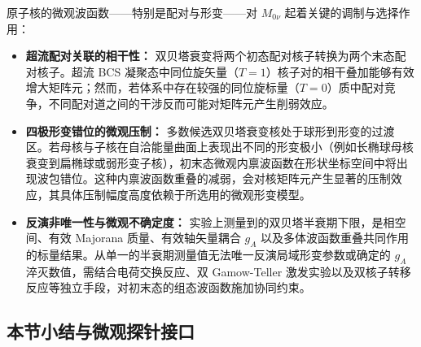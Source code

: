 原子核的微观波函数——特别是配对与形变——对 $M_{0\nu}$ 起着关键的调制与选择作用：
\begin{itemize}
\item \textbf{超流配对关联的相干性：} 双贝塔衰变将两个初态配对核子转换为两个末态配对核子。超流 BCS 凝聚态中同位旋矢量（$T=1$）核子对的相干叠加能够有效增大矩阵元；然而，若体系中存在较强的同位旋标量（$T=0$）质中配对竞争，不同配对道之间的干涉反而可能对矩阵元产生削弱效应。
\item \textbf{四极形变错位的微观压制：} 多数候选双贝塔衰变核处于球形到形变的过渡区。若母核与子核在自洽能量曲面上表现出不同的形变极小（例如长椭球母核衰变到扁椭球或弱形变子核），初末态微观内禀波函数在形状坐标空间中将出现波包错位。这种内禀波函数重叠的减弱，会对核矩阵元产生显著的压制效应，其具体压制幅度高度依赖于所选用的微观形变模型。
\item \textbf{反演非唯一性与微观不确定度：} 实验上测量到的双贝塔半衰期下限，是相空间、有效 Majorana 质量、有效轴矢量耦合 $g_A$ 以及多体波函数重叠共同作用的标量结果。从单一的半衰期测量值无法唯一反演局域形变参数或确定的 $g_A$ 淬灭数值，需结合电荷交换反应、双 Gamow-Teller 激发实验以及双核子转移反应等独立手段，对初末态的组态波函数施加协同约束。
\end{itemize}

\subsection{本节小结与微观探针接口}\label{sec:4-7-4}

